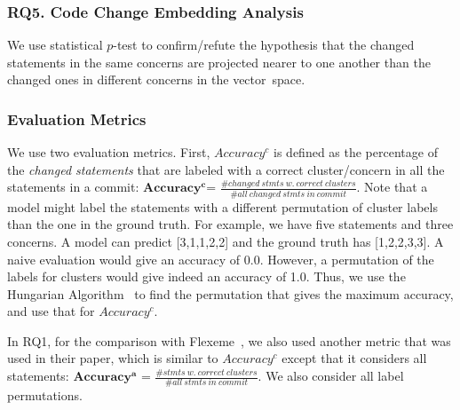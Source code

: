 \subsubsection{RQ5. Code Change Embedding Analysis}

We use statistical $p$-test to confirm/refute the hypothesis that the
changed statements in the same concerns are projected nearer to one
another than the changed ones in different concerns in the
vector~space.




\subsubsection*{Evaluation Metrics}

We use two evaluation metrics. First, $Accuracy^{c}$ is defined as the
percentage of the {\em changed statements} that are labeled with a
correct cluster/concern in all the statements in a commit:
$\mathbf{Accuracy^{c}}$= $\frac{\#
changed\:stmts\:w.\:correct\:clusters}{\#
all\:changed\:stmts\:in\:commit}$.  Note that a model might label the
statements with a different permutation of cluster labels than the one
in the ground truth. For example, we have five statements and three
concerns. A model can predict [3,1,1,2,2] and the ground truth has
[1,2,2,3,3]. A naive evaluation would give an accuracy of
0.0. However, a permutation of the labels for clusters would give
indeed an accuracy of 1.0. Thus, we use the Hungarian
Algorithm~\cite{hungarian-algo} to find the permutation that gives the
maximum accuracy, and use that for $Accuracy^{c}$.

In RQ1, for the comparison with Flexeme~\cite{flexeme-fse20}, we also
used another metric that was used in their paper, which is similar to
$Accuracy^{c}$ except that it considers all statements: $\mathbf{Accuracy^{a}}$
= $\frac{\# stmts\:w.\:correct\:clusters}{\# all\:stmts\:in\:commit}$.
We also consider all label permutations.



